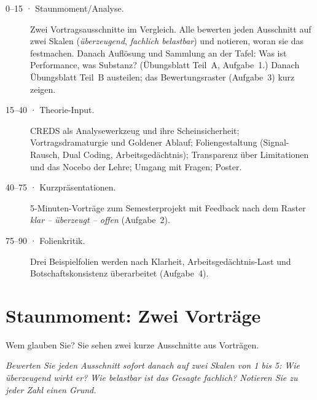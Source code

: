 \begin{ablauf}
\begin{description}
\item[0--15 · Staunmoment/Analyse.] Zwei Vortragsausschnitte im Vergleich.
  Alle bewerten jeden Ausschnitt auf zwei Skalen (\emph{überzeugend},
  \emph{fachlich belastbar}) und notieren, woran sie das festmachen. Danach
  Auflösung und Sammlung an der Tafel: Was ist Performance, was Substanz?
  (Übungsblatt Teil~A, Aufgabe~1.) Danach Übungsblatt Teil~B austeilen;
  das Bewertungsraster (Aufgabe~3) kurz zeigen.
\item[15--40 · Theorie-Input.] CREDS als Analysewerkzeug und ihre
  Scheinsicherheit; Vortragsdramaturgie und Goldener Ablauf;
  Foliengestaltung (Signal-Rausch, Dual Coding, Arbeitsgedächtnis);
  Transparenz über Limitationen und das Nocebo der Lehre; Umgang mit
  Fragen; Poster.
\item[40--75 · Kurzpräsentationen.] 5-Minuten-Vorträge zum
  Semesterprojekt mit Feedback nach dem Raster \emph{klar -- überzeugt --
  offen} (Aufgabe~2).
\item[75--90 · Folienkritik.] Drei Beispielfolien werden nach Klarheit,
  Arbeitsgedächtnis-Last und Botschaftskonsistenz überarbeitet
  (Aufgabe~4).
\end{description}
\end{ablauf}

\section{Staunmoment: Zwei Vorträge}
\begin{staunbox}{Wem glauben Sie?}
Sie sehen zwei kurze Ausschnitte aus Vorträgen.

\medskip
\emph{Bewerten Sie jeden Ausschnitt sofort danach auf zwei Skalen von 1 bis 5:
Wie überzeugend wirkt er? Wie belastbar ist das Gesagte fachlich? Notieren
Sie zu jeder Zahl einen Grund.}
\end{staunbox}
\os{\newpage}

